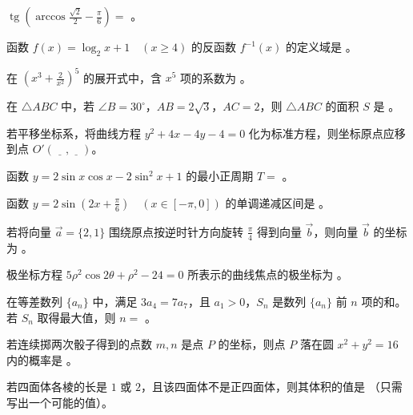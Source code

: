 \begin{question}
$\operatorname{tg}\left(\arccos\frac{\sqrt2}{2}-\frac\pi6\right)=$ \gkblank{}。

\end{question}
\begin{question}
函数 $f(x)=\log_2 x+1\quad (x\ge4)$ 的反函数 $f^{-1}(x)$ 的定义域是 \gkblank{}。

\end{question}
\begin{question}
在 $\left(x^3+\frac2{x^2}\right)^5$ 的展开式中，含 $x^5$ 项的系数为 \gkblank{}。

\end{question}
\begin{question}
在 $\triangle ABC$ 中，若 $\angle B=30^\circ$，$AB=2\sqrt3$，$AC=2$，则 $\triangle ABC$ 的面积 $S$ 是 \gkblank{}。

\end{question}
\begin{question}
若平移坐标系，将曲线方程 $y^2+4x-4y-4=0$ 化为标准方程，则坐标原点应移到点 $O'(\underline{\quad},\underline{\quad})$。

\end{question}
\begin{question}
函数 $y=2\sin x\cos x-2\sin^2x+1$ 的最小正周期 $T=$ \gkblank{}。

\end{question}
\begin{question}
函数 $y=2\sin\left(2x+\frac\pi6\right)\quad (x\in[-\pi,0])$ 的单调递减区间是 \gkblank{}。

\end{question}
\begin{question}
若将向量 $\vec a=\{2,1\}$ 围绕原点按逆时针方向旋转 $\frac\pi4$ 得到向量 $\vec b$，则向量 $\vec b$ 的坐标为 \gkblank{}。

\end{question}
\begin{question}
极坐标方程 $5\rho^2\cos2\theta+\rho^2-24=0$ 所表示的曲线焦点的极坐标为 \gkblank{}。

\end{question}
\begin{question}
在等差数列 $\{a_n\}$ 中，满足 $3a_4=7a_7$，且 $a_1>0$，$S_n$ 是数列 $\{a_n\}$ 前 $n$ 项的和。若 $S_n$ 取得最大值，则 $n=$ \gkblank{}。

\end{question}
\begin{question}
若连续掷两次骰子得到的点数 $m,n$ 是点 $P$ 的坐标，则点 $P$ 落在圆 $x^2+y^2=16$ 内的概率是 \gkblank{}。

\end{question}
\begin{question}
若四面体各棱的长是 $1$ 或 $2$，且该四面体不是正四面体，则其体积的值是 \gkblank{}（只需写出一个可能的值）。

\end{question}


